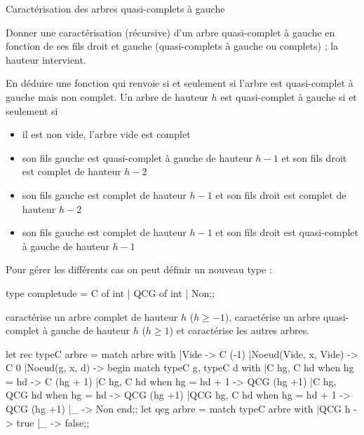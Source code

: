 \begin{exo}{Caractérisation des arbres quasi-complets à gauche}{}

Donner une caractérisation (récursive) d'un arbre quasi-complet à gauche en fonction de ses fils droit et gauche (quasi-complets à gauche ou complets) ; la hauteur intervient.

En déduire une fonction  qui renvoie  si et seulement si l'arbre est quasi-complet à gauche mais non complet.
\reponse
Un arbre de hauteur $h$ est quasi-complet à gauche si et seulement si
\begin{itemize}
    \item il est non vide, l'arbre vide est complet
    \item son fils gauche est quasi-complet à gauche de hauteur $h-1$ et son fils droit est complet de hauteur $h-2$
    \item son fils gauche est complet de hauteur $h-1$ et son fils droit est complet de hauteur $h-2$
    \item son fils gauche est complet de hauteur $h-1$ et son fils droit est quasi-complet à gauche de hauteur $h-1$
\end{itemize}

Pour gérer les différents cas on peut définir un nouveau type :
\begin{ocaml}
type completude = C of int | QCG of int | Non;;
\end{ocaml}
 caractérise un arbre complet de hauteur $h$ ($h\ge -1$),  caractérise un arbre quasi-complet à gauche de hauteur $h$ ($h\ge 1$) et  caractérise les autres arbres.

\begin{ocaml}
let rec typeC arbre =
   match arbre with
   |Vide -> C (-1)
   |Noeud(Vide, x, Vide) -> C 0
   |Noeud(g, x, d) -> begin match typeC g, typeC d with
                      |C hg, C hd when hg = hd -> C (hg + 1)
                      |C hg, C hd when hg = hd + 1 -> QCG (hg +1)
                      |C hg, QCG hd when hg = hd -> QCG (hg +1)
                      |QCG hg, C hd when hg = hd + 1 -> QCG (hg +1)
                      |_ -> Non end;;
let qcg arbre =
   match typeC arbre with
   |QCG h -> true
   |_ -> false;;
\end{ocaml}
\end{exo}
\newpage
